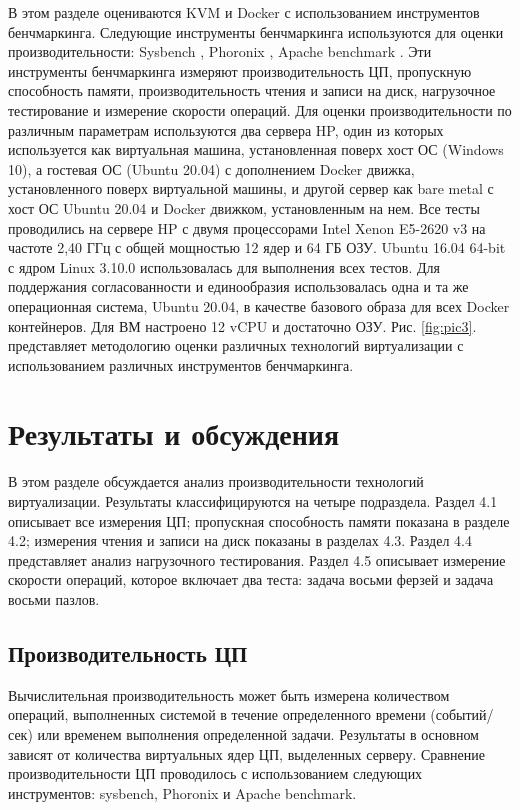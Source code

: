 \documentclass{mirea}
\begin{document}
	
	В этом разделе оцениваются KVM и Docker с использованием инструментов бенчмаркинга. Следующие инструменты бенчмаркинга используются для оценки производительности: Sysbench \cite{cit11}, Phoronix \cite{cit12}, Apache benchmark \cite{cit13}. Эти инструменты бенчмаркинга измеряют производительность ЦП, пропускную способность памяти, производительность чтения и записи на диск, нагрузочное тестирование и измерение скорости операций. Для оценки производительности по различным параметрам используются два сервера HP, один из которых используется как виртуальная машина, установленная поверх хост ОС (Windows 10), а гостевая ОС (Ubuntu 20.04) с дополнением Docker движка, установленного поверх виртуальной машины, и другой сервер как bare metal с хост ОС Ubuntu 20.04 и Docker движком, установленным на нем. Все тесты проводились на сервере HP с двумя процессорами Intel Xenon E5-2620 v3 на частоте 2,40 ГГц с общей мощностью 12 ядер и 64 ГБ ОЗУ. Ubuntu 16.04 64-bit с ядром Linux 3.10.0 использовалась для выполнения всех тестов. Для поддержания согласованности и единообразия использовалась одна и та же операционная система, Ubuntu 20.04, в качестве базового образа для всех Docker контейнеров. Для ВМ настроено 12 vCPU и достаточно ОЗУ. Рис. \ref{fig:pic3}. представляет методологию оценки различных технологий виртуализации с использованием различных инструментов бенчмаркинга.
	
	\section{Результаты и обсуждения}
	
	В этом разделе обсуждается анализ производительности технологий виртуализации. Результаты классифицируются на четыре подраздела. Раздел 4.1 описывает все измерения ЦП; пропускная способность памяти показана в разделе 4.2; измерения чтения и записи на диск показаны в разделах 4.3. Раздел 4.4 представляет анализ нагрузочного тестирования. Раздел 4.5 описывает измерение скорости операций, которое включает два теста: задача восьми ферзей и задача восьми пазлов.
	
	\subsection{Производительность ЦП}
	
	Вычислительная производительность может быть измерена количеством операций, выполненных системой в течение определенного времени (событий/сек) или временем выполнения определенной задачи. Результаты в основном зависят от количества виртуальных ядер ЦП, выделенных серверу. Сравнение производительности ЦП проводилось с использованием следующих инструментов: sysbench, Phoronix и Apache benchmark.
	
\end{document}
